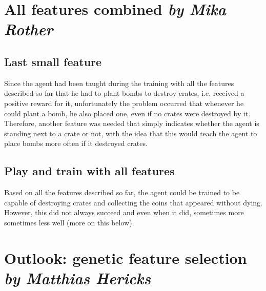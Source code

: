 \section[All features combined]{All features combined \hfill \small \normalfont\textit{by Mika Rother}}

\subsection{Last small feature}
Since the agent had been taught during the training with all the features described so far that he had to plant bombs to destroy crates, i.e. received a positive reward for it, unfortunately the problem occurred that whenever he could plant a bomb, he also placed one, even if no crates were destroyed by it. Therefore, another feature was needed that simply indicates whether the agent is standing next to a crate or not, with the idea that this would teach the agent to place bombs more often if it destroyed crates.

\subsection{Play and train with all features}
Based on all the features described so far, the agent could be trained to be capable of destroying crates and collecting the coins that appeared without dying. However, this did not always succeed and even when it did, sometimes more sometimes less well (more on this below). 

\section[Outlook: genetic feature selection]{Outlook: genetic feature selection \hfill \small \normalfont\textit{by Matthias Hericks}}












